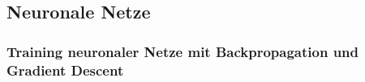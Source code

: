 \subsection{Neuronale Netze}



\subsubsection{Training neuronaler Netze mit Backpropagation und Gradient Descent}

